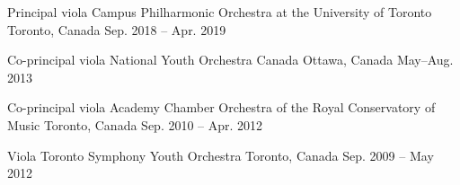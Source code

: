

\begin{cventries}

  \cventry
    {Principal viola}
    {Campus Philharmonic Orchestra at the University of Toronto}
    {Toronto, Canada}
    {Sep. 2018 -- Apr. 2019}
    {}
    
  \cventry
    {Co-principal viola}
    {National Youth Orchestra Canada}
    {Ottawa, Canada}
    {May--Aug. 2013}
    {}
    
  \cventry
    {Co-principal viola}
    {Academy Chamber Orchestra of the Royal Conservatory of Music}
    {Toronto, Canada}
    {Sep. 2010 -- Apr. 2012}
    {}
    
  \cventry
    {Viola}
    {Toronto Symphony Youth Orchestra}
    {Toronto, Canada}
    {Sep. 2009 -- May 2012}
    {}
    
\end{cventries}
